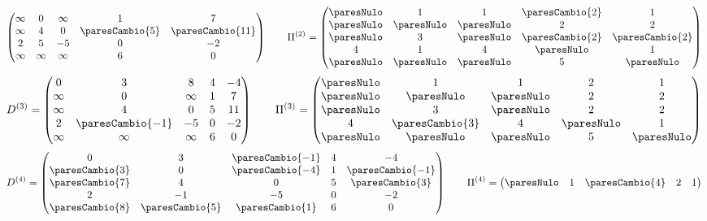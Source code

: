 \documentclass[11pt,letterpaper]{article}
\begin{document}
\begin{ejemplo}
{\[\begin{pmatrix}
    \infty & 0 & \infty & 1 & 7 \\
    \infty & 4 & 0 & \paresCambio{5} & \paresCambio{11} \\
    2 & 5 & -5 & 0 & -2 \\
    \infty & \infty & \infty & 6 & 0
  \end{pmatrix}
  \qquad
  \Pi^{(2)} = \begin{pmatrix}
    \paresNulo & 1 & 1 & \paresCambio{2} & 1 \\
    \paresNulo & \paresNulo & \paresNulo & 2 & 2 \\
    \paresNulo & 3 & \paresNulo & \paresCambio{2} & \paresCambio{2} \\
    4 & 1 & 4 & \paresNulo & 1 \\
    \paresNulo & \paresNulo & \paresNulo & 5 & \paresNulo
  \end{pmatrix}
  \]
  \[
  D^{(3)} = \begin{pmatrix}
    0 & 3 & 8 & 4 & -4 \\
    \infty & 0 & \infty & 1 & 7 \\
    \infty & 4 & 0 & 5 & 11 \\
    2 & \paresCambio{-1} & -5 & 0 & -2 \\
    \infty & \infty & \infty & 6 & 0
  \end{pmatrix}
  \qquad
  \Pi^{(3)} = \begin{pmatrix}
    \paresNulo & 1 & 1 & 2 & 1 \\
    \paresNulo & \paresNulo & \paresNulo & 2 & 2 \\
    \paresNulo & 3 & \paresNulo & 2 & 2 \\
    4 & \paresCambio{3} & 4 & \paresNulo & 1 \\
    \paresNulo & \paresNulo & \paresNulo & 5 & \paresNulo
  \end{pmatrix}
  \]
  \[
  D^{(4)} = \begin{pmatrix}
    0 & 3 & \paresCambio{-1} & 4 & -4 \\
    \paresCambio{3} & 0 & \paresCambio{-4} & 1 & \paresCambio{-1} \\
    \paresCambio{7} & 4 & 0 & 5 & \paresCambio{3} \\
    2 & -1 & -5 & 0 & -2 \\
    \paresCambio{8} & \paresCambio{5} & \paresCambio{1} & 6 & 0
  \end{pmatrix}
  \qquad
  \Pi^{(4)} = \begin{pmatrix}
    \paresNulo & 1 & \paresCambio{4} & 2 & 1 \\

\end{pmatrix}\]}
\end{ejemplo}
\end{document}
